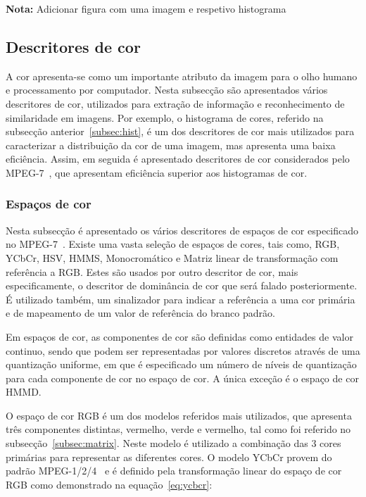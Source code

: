 \textbf{Nota:} Adicionar figura com uma imagem e respetivo histograma

\subsection{Descritores de cor}

A cor apresenta-se como um importante atributo da imagem para o olho humano e processamento por computador. Nesta subsecção são apresentados vários descritores de cor, utilizados para extração de informação e reconhecimento de similaridade em imagens. Por exemplo, o histograma de cores, referido na subsecção anterior~\ref{subsec:hist}, é um dos descritores de cor mais utilizados para caracterizar a distribuição da cor de uma imagem, mas apresenta uma baixa eficiência. Assim, em seguida é apresentado descritores de cor considerados pelo MPEG-7~\cite{Manjunath2001, Christopoulos2000, Cieplinski2001, Ite-vil}, que apresentam eficiência superior aos histogramas de cor.


\subsubsection{Espaços de cor} \label{subsubsec:space}

Nesta subsecção é apresentado os vários descritores de espaços de cor especificado no MPEG-7~\cite{Ite-vil}. Existe uma vasta seleção de espaços de cores, tais como, RGB, YCbCr, HSV, HMMS, Monocromático e Matriz linear de transformação com referência a RGB. Estes são usados por outro descritor de cor, mais especificamente, o descritor de dominância de cor que será falado posteriormente. É utilizado também, um sinalizador para indicar a referência a uma cor primária e de mapeamento de um valor de referência do branco padrão. 

Em espaços de cor, as componentes de cor são definidas como entidades de valor continuo, sendo que podem ser representadas por valores discretos através de uma quantização uniforme, em que é especificado um número de níveis de quantização para cada componente de cor no espaço de cor. A única exceção é o espaço de cor HMMD.

O espaço de cor RGB é um dos modelos referidos mais utilizados, que apresenta três componentes distintas, vermelho, verde e vermelho, tal como foi referido no subsecção~\ref{subsec:matrix}. Neste modelo é utilizado a combinação das 3 cores primárias para representar as diferentes cores. O modelo YCbCr provem do padrão MPEG-1/2/4~\cite{Ite-vil} e é definido pela transformação linear do espaço de cor RGB como demonstrado na equação~\ref{eq:ycbcr}:

